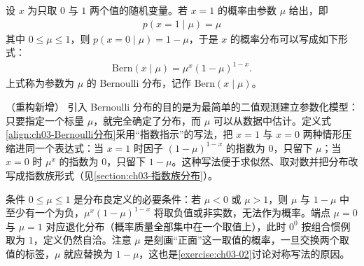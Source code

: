 \documentclass[../../main.tex]{subfiles}
\begin{document}
\begin{definition}[Bernoulli 分布]\label{definition:ch03-Bernoulli分布}
设 $x$ 为只取 $0$ 与 $1$ 两个值的随机变量。若 $x=1$ 的概率由参数 $\mu$ 给出，即
\begin{align}
p(x=1\mid\mu)=\mu
\label{align:ch03-Bernoulli正面概率}
\end{align}
其中 $0\leqslant\mu\leqslant1$，则 $p(x=0\mid\mu)=1-\mu$，于是 $x$ 的概率分布可以写成如下形式：
\begin{align}
\mathrm{Bern}(x\mid\mu)=\mu^{x}(1-\mu)^{1-x}.
\label{align:ch03-Bernoulli分布}
\end{align}
上式称为参数为 $\mu$ 的 Bernoulli 分布，记作 $\mathrm{Bern}(x\mid\mu)$。
\end{definition}

\begin{remark}（重构新增）
引入 Bernoulli 分布的目的是为最简单的二值观测建立参数化模型：只要指定一个标量 $\mu$，就完全确定了分布，而 $\mu$ 可以从数据中估计。定义式\eqref{align:ch03-Bernoulli分布}采用“指数指示”的写法，把 $x=1$ 与 $x=0$ 两种情形压缩进同一个表达式：当 $x=1$ 时因子 $(1-\mu)^{1-x}$ 的指数为 $0$，只留下 $\mu$；当 $x=0$ 时 $\mu^{x}$ 的指数为 $0$，只留下 $1-\mu$。这种写法便于求似然、取对数并把分布改写成指数族形式（见\cref{section:ch03-指数族分布}）。

条件 $0\leqslant\mu\leqslant1$ 是分布良定义的必要条件：若 $\mu<0$ 或 $\mu>1$，则 $\mu$ 与 $1-\mu$ 中至少有一个为负，$\mu^{x}(1-\mu)^{1-x}$ 将取负值或非实数，无法作为概率。端点 $\mu=0$ 与 $\mu=1$ 对应退化分布（概率质量全部集中在一个取值上），此时 $0^{0}$ 按组合惯例取为 $1$，定义仍然自洽。注意 $\mu$ 是刻画“正面”这一取值的概率，一旦交换两个取值的标签，$\mu$ 就应替换为 $1-\mu$，这也是\cref{exercise:ch03-02}讨论对称写法的原因。
\end{remark}
\end{document}
